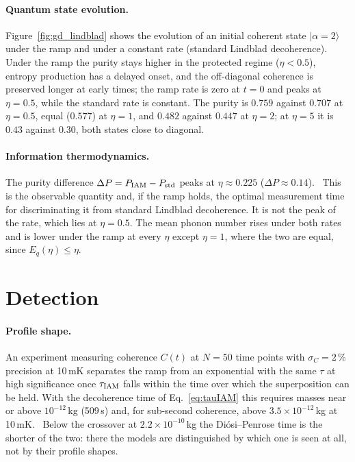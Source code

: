 \paragraph{Quantum state evolution.} Figure~\ref{fig:gd_lindblad} shows the evolution of an initial coherent state $|\alpha=2\rangle$ under the ramp and
under a constant rate (standard Lindblad decoherence). Under the ramp the purity stays higher in the protected regime ($\eta<0.5$), entropy production has a
delayed onset, and the off-diagonal coherence is preserved longer at early times; the ramp rate is zero at $t=0$ and peaks at $\eta=0.5$, while the standard
rate is constant. The purity is $0.759$ against $0.707$ at $\eta=0.5$, equal ($0.577$) at $\eta=1$, and $0.482$ against $0.447$ at $\eta=2$; at $\eta=5$ it is
$0.43$ against $0.30$, both states close to diagonal. \calc

\paragraph{Information thermodynamics.} The purity difference $\Delta P=P_{\rm IAM}-P_{\rm std}$ peaks at $\eta\approx0.225$ ($\Delta P\approx0.14$). \calc\
This is the observable quantity and, if the ramp holds, the optimal measurement time for discriminating it from standard Lindblad decoherence. It is not the
peak of the rate, which lies at $\eta=0.5$. The mean phonon number rises under both rates and is lower under the ramp at every $\eta$ except $\eta=1$, where the two are equal, since $E_q(\eta)\le\eta$. \derived

\section{Detection}\label{sec:gd_detection}
\paragraph{Profile shape.} An experiment measuring coherence $C(t)$ at $N=50$ time points with $\sigma_C=2\,\%$ precision at 10\,mK separates the ramp from an
exponential with the same $\tau$ at high significance once $\tau_{\rm IAM}$ falls within the time over which the superposition can be held. With the
decoherence time of Eq.~\eqref{eq:tauIAM} this requires masses near or above $10^{-12}$\,kg (509\,s) and, for sub-second coherence, above
$3.5\times10^{-12}$\,kg at 10\,mK. \calc\ Below the crossover at $2.2\times10^{-10}$\,kg the Di\'osi--Penrose time is the shorter of the two: there the models
are distinguished by which one is seen at all, not by their profile shapes.

